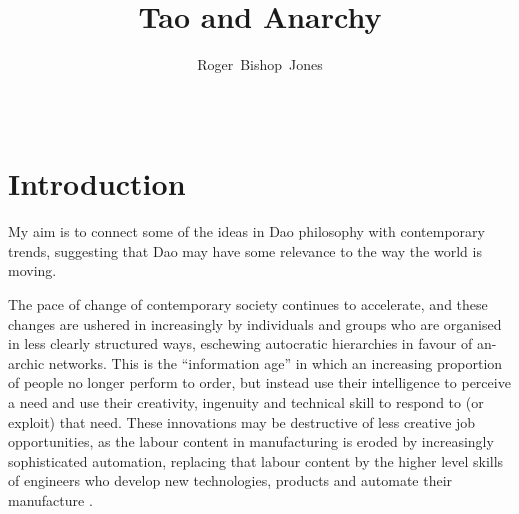 \documentclass[10pt,titlepage]{article}
\title{Tao and Anarchy}
\author{Roger~Bishop~Jones}
\date{\ }
\begin{document}
                               
\begin{titlepage}
\maketitle






\end{titlepage}

\setcounter{tocdepth}{2}
{\parskip-0pt\tableofcontents}



\section{Introduction}

My aim is to connect some of the ideas in Dao philosophy with contemporary trends,
suggesting that Dao may have some relevance to the way the world is moving.

The pace of change of contemporary society continues to accelerate, and these changes are ushered in increasingly by individuals and groups who are organised in less clearly structured ways, eschewing autocratic hierarchies in favour of an-archic networks.
This is the ``information age'' in which an increasing proportion of people no longer perform to order, but instead use their intelligence to perceive a need and use their creativity, ingenuity and technical skill to respond to (or exploit) that need.
These innovations may be destructive of less creative job opportunities, as the labour content in manufacturing is eroded by increasingly sophisticated automation, replacing that labour content by the higher level skills of engineers who develop new technologies, products and automate their manufacture .
\end{document}
